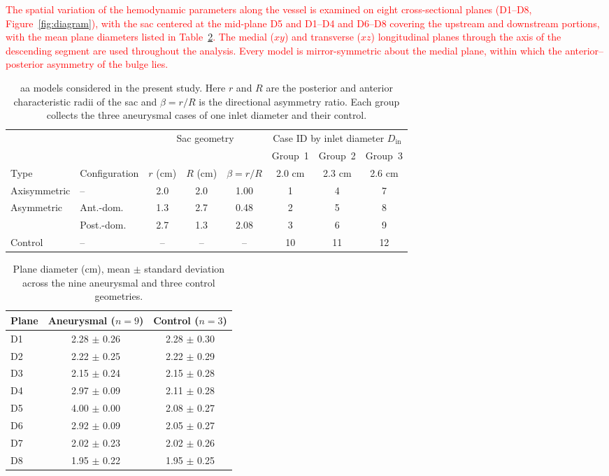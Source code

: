 \documentclass[12pt,a4paper]{article}
\newcommand{\AANcap}{\Ac{aa}\xspace}
\theoremstyle{definition}
\numberwithin{equation}{section}
\newcommand{\revision}[1]{\textcolor{red}{#1}}
\begin{document}
\revision{The spatial variation of the hemodynamic parameters along the vessel is examined on eight cross-sectional planes (D1--D8, Figure~\ref{fig:diagram}), with the sac centered at the mid-plane D5 and D1--D4 and D6--D8 covering the upstream and downstream portions, with the mean plane diameters listed in Table~\ref{tab:diameter}. The medial ($xy$) and transverse ($xz$) longitudinal planes through the axis of the descending segment are used throughout the analysis. Every model is mirror-symmetric about the medial plane, within which the anterior--posterior asymmetry of the bulge lies.}

\begin{table}[htbp]
\centering
\caption{\AANcap models considered in the present study. Here $r$ and $R$ are the {posterior and anterior} characteristic radii of the sac and $\beta = r/R$ is the directional asymmetry ratio. Each group collects the three aneurysmal cases of one inlet diameter and their control.}
\label{tab:geometries}
\setlength{\tabcolsep}{4pt}
\begin{tabular}{ll ccc ccc}
\toprule
& & \multicolumn{3}{c}{Sac geometry}
  & \multicolumn{3}{c}{Case ID by inlet diameter \(D_{\mathrm{in}}\)} \\
\cmidrule(lr){3-5} \cmidrule(lr){6-8}
& & & & & Group~1 & Group~2 & Group~3 \\
Type & Configuration & \(r\) (cm) & \(R\) (cm) & \(\beta = r/R\)
     & 2.0 cm & 2.3 cm & 2.6 cm \\
\midrule
Axisymmetric & --         & 2.0 & 2.0 & 1.00 & 1  & 4  & 7  \\
Asymmetric   & Ant.-dom.  & 1.3 & 2.7 & 0.48 & 2  & 5  & 8  \\
             & Post.-dom. & 2.7 & 1.3 & 2.08 & 3  & 6  & 9  \\
Control      & --         & --  & --  & --   & 10 & 11 & 12 \\
\bottomrule
\end{tabular}
\end{table}

\begin{table}[htbp]
\centering
\caption{Plane diameter (cm), mean $\pm$ standard deviation across the nine aneurysmal and three control geometries.}
\begin{tabular}{lcc}
\toprule
Plane & Aneurysmal ($n=9$) & Control ($n=3$) \\
\midrule
D1 & 2.28 $\pm$ 0.26 & 2.28 $\pm$ 0.30 \\
D2 & 2.22 $\pm$ 0.25 & 2.22 $\pm$ 0.29 \\
D3 & 2.15 $\pm$ 0.24 & 2.15 $\pm$ 0.28 \\
D4 & 2.97 $\pm$ 0.09 & 2.11 $\pm$ 0.28 \\
D5 & 4.00 $\pm$ 0.00 & 2.08 $\pm$ 0.27 \\
D6 & 2.92 $\pm$ 0.09 & 2.05 $\pm$ 0.27 \\
D7 & 2.02 $\pm$ 0.23 & 2.02 $\pm$ 0.26 \\
D8 & 1.95 $\pm$ 0.22 & 1.95 $\pm$ 0.25 \\
\bottomrule
\end{tabular}
\label{tab:diameter}
\end{table}
\end{document}
